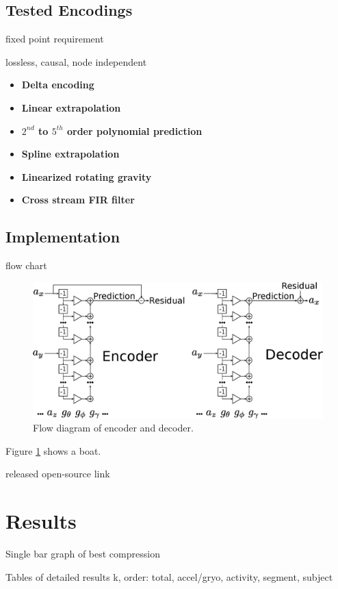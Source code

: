 \documentclass[journal]{IEEEtran}
\begin{document}
\subsection{Tested Encodings}



fixed point requirement

lossless, causal, node independent
\begin{itemize}
  \item \textbf{Delta encoding}
  \item \textbf{Linear extrapolation}
  \item \textbf{\boldmath$2^{nd}$ to \boldmath$5^{th}$ order polynomial prediction}
  \item \textbf{Spline extrapolation}
  \item \textbf{Linearized rotating gravity}
  \item \textbf{Cross stream FIR filter}
\end{itemize}

\subsection{Implementation}
flow chart

\begin{figure}
  \includegraphics[width=\linewidth]{flow_diagram.eps}
  \caption{Flow diagram of encoder and decoder.}
  \label{fig:flow_diagram}
\end{figure}

Figure \ref{fig:flow_diagram} shows a boat.


released open-source link
\section{Results}
Single bar graph of best compression

Tables of detailed results k, order: total, accel/gryo, activity, segment, subject 
\end{document}
